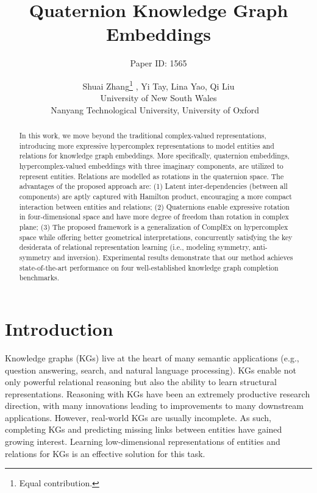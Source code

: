 \documentclass{article}
\title{Quaternion Knowledge Graph Embeddings}
\author{Paper ID: 1565}
\author{
Shuai Zhang\thanks{Equal contribution.} , Yi Tay\footnotemark[1], Lina Yao, Qi Liu\\
  University of New South Wales \\
 Nanyang Technological University, University of Oxford \
}
\begin{document}
\maketitle

\begin{abstract}
In this work, we move beyond the traditional complex-valued representations, introducing more expressive hypercomplex representations to model entities and relations for knowledge graph embeddings. More specifically, quaternion embeddings, hypercomplex-valued embeddings with three imaginary components, are utilized to represent entities. Relations are modelled as rotations in the quaternion space. The advantages of the proposed approach are: (1) Latent inter-dependencies (between all components) are aptly captured with Hamilton product, encouraging a more compact interaction between entities and relations; (2) Quaternions enable expressive rotation in four-dimensional space and have more degree of freedom than rotation in complex plane; (3) The proposed framework is a generalization of ComplEx on hypercomplex space while offering better geometrical interpretations, concurrently satisfying the key desiderata of relational representation learning (i.e., modeling symmetry, anti-symmetry and inversion). Experimental results demonstrate that our method achieves state-of-the-art performance on four well-established knowledge graph completion benchmarks.








\end{abstract}

\section{Introduction}
Knowledge graphs (KGs) live at the heart of many semantic applications (e.g., question answering, search, and natural language processing). KGs enable not only powerful relational reasoning but also the ability to learn structural representations. Reasoning with KGs have been an extremely productive research direction, with many innovations leading to improvements to many downstream applications. However, real-world KGs are usually incomplete. As such, completing KGs and predicting missing links between entities have gained growing interest. Learning low-dimensional representations of entities and relations for KGs is an effective solution for this task.
\end{document}
